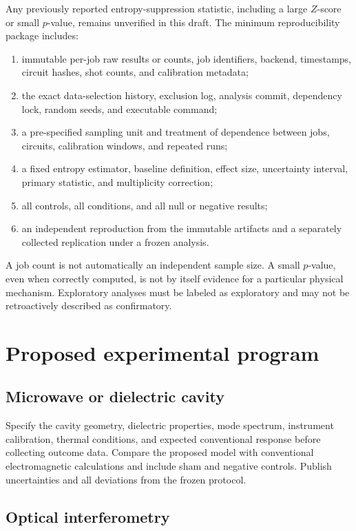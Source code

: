 \documentclass[aps,preprint,superscriptaddress,longbibliography]{revtex4-2}
\begin{document}
Any previously reported entropy-suppression statistic, including a large
$Z$-score or small $p$-value, remains unverified in this draft. The
minimum reproducibility package includes:
\begin{enumerate}
  \item immutable per-job raw results or counts, job identifiers, backend,
  timestamps, circuit hashes, shot counts, and calibration metadata;
  \item the exact data-selection history, exclusion log, analysis commit,
  dependency lock, random seeds, and executable command;
  \item a pre-specified sampling unit and treatment of dependence between
  jobs, circuits, calibration windows, and repeated runs;
  \item a fixed entropy estimator, baseline definition, effect size,
  uncertainty interval, primary statistic, and multiplicity correction;
  \item all controls, all conditions, and all null or negative results;
  \item an independent reproduction from the immutable artifacts and a
  separately collected replication under a frozen analysis.
\end{enumerate}

A job count is not automatically an independent sample size. A small
$p$-value, even when correctly computed, is not by itself evidence for a
particular physical mechanism. Exploratory analyses must be labeled as
exploratory and may not be retroactively described as confirmatory.

\section{Proposed experimental program}

\subsection{Microwave or dielectric cavity}

Specify the cavity geometry, dielectric properties, mode spectrum,
instrument calibration, thermal conditions, and expected conventional
response before collecting outcome data. Compare the proposed model with
conventional electromagnetic calculations and include sham and negative
controls. Publish uncertainties and all deviations from the frozen
protocol.

\subsection{Optical interferometry}
\end{document}
